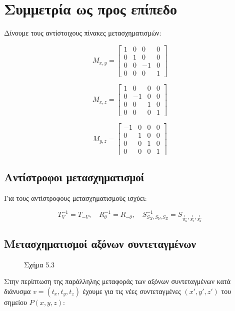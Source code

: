 \section{Συμμετρία ως προς επίπεδο}

Δίνουμε τους αντίστοιχους πίνακες μετασχηματισμών:

\[
M_{x, y} = 
\begin{bmatrix}
1 & 0 & 0 & 0 \\
0 & 1 & 0 & 0 \\
0 & 0 & -1 & 0 \\
0 & 0 & 0 & 1
\end{bmatrix}
\]

\[
M_{x, z} = 
\begin{bmatrix}
1 & 0 & 0 & 0 \\
0 & -1 & 0 & 0 \\
0 & 0 & 1 & 0 \\
0 & 0 & 0 & 1
\end{bmatrix}
\]

\[
M_{y, z} = 
\begin{bmatrix}
-1 & 0 & 0 & 0 \\
0 & 1 & 0 & 0 \\
0 & 0 & 1 & 0 \\
0 & 0 & 0 & 1
\end{bmatrix}
\]



\subsection*{Αντίστροφοι μετασχηματισμοί}

Για τους αντίστροφους μετασχηματισμούς ισχύει:

\[
T^{-1}_{V} = T_{-V}, \quad R^{-1}_{\theta} = R_{-\theta}, \quad S^{-1}_{S_X,S_Y,S_Z} = S_{\frac{1}{S_X}, \frac{1}{S_Y}, \frac{1}{S_Z}}
\]

\subsection{Μετασχηματισμοί αξόνων συντεταγμένων}

\begin{figure}[h]
\centering
\caption{Σχήμα 5.3}
\end{figure}

Στην περίπτωση της παράλληλης μεταφοράς των αξόνων συντεταγμένων κατά διάνυσμα \( v = (t_x, t_y, t_z) \) έχουμε για τις νέες συντεταγμένες \( (x', y', z') \) του σημείου \( P(x, y, z) \):

